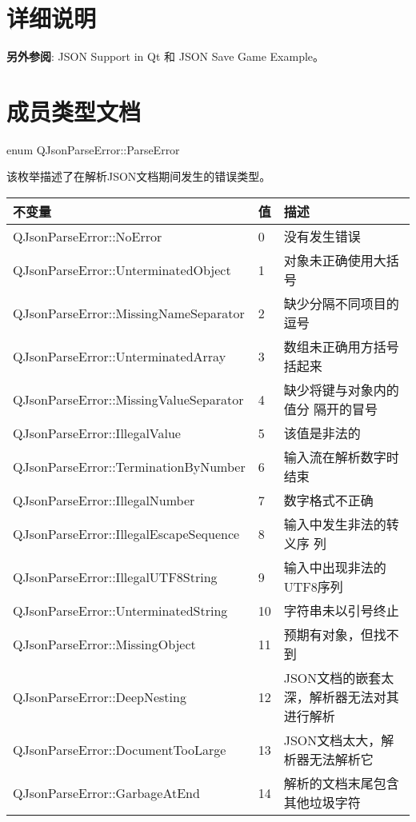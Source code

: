 \section{详细说明}

\textbf{另外参阅}: JSON Support in Qt 和 JSON Save Game Example。


\section{成员类型文档}

enum QJsonParseError::ParseError

该枚举描述了在解析JSON文档期间发生的错误类型。

\begin{longtable}{|l|l|l|}
\hline
不变量& 	值& 	描述\\
\hline
QJsonParseError::NoError& 	0& 	没有发生错误\\
\hline
QJsonParseError::UnterminatedObject& 	1& 	对象未正确使用大括号\\
\hline
QJsonParseError::MissingNameSeparator& 	2& 	缺少分隔不同项目的逗号\\
\hline
QJsonParseError::UnterminatedArray& 	3& 	数组未正确用方括号括起来\\
\hline
QJsonParseError::MissingValueSeparator& 	4& 	缺少将键与对象内的值分
                                               隔开的冒号\\
\hline
QJsonParseError::IllegalValue& 	5& 	该值是非法的\\
\hline
QJsonParseError::TerminationByNumber& 	6& 	输入流在解析数字时结束\\
\hline
QJsonParseError::IllegalNumber& 	7& 	数字格式不正确\\
\hline
QJsonParseError::IllegalEscapeSequence& 	8& 	输入中发生非法的转义序
                                               列\\
\hline
QJsonParseError::IllegalUTF8String& 	9& 	输入中出现非法的UTF8序列\\
\hline
QJsonParseError::UnterminatedString& 	10& 	字符串未以引号终止\\
\hline
QJsonParseError::MissingObject& 	11& 	预期有对象，但找不到\\
\hline
QJsonParseError::DeepNesting& 	12& 	JSON文档的嵌套太深，解析器无法对其进行解析\\
\hline
QJsonParseError::DocumentTooLarge& 	13& 	JSON文档太大，解析器无法解析它\\
\hline
QJsonParseError::GarbageAtEnd& 	14& 	解析的文档末尾包含其他垃圾字符\\
\hline
\end{longtable}


